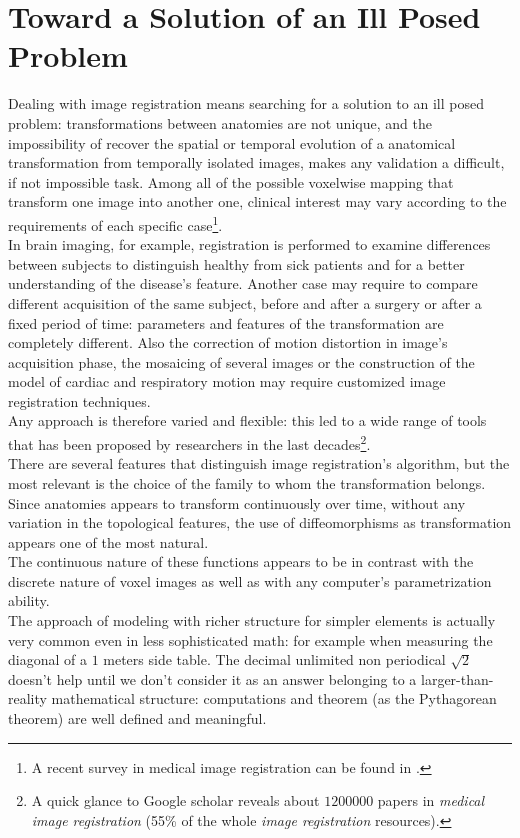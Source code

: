 \section*{Toward a Solution of an Ill Posed Problem}
Dealing with image registration means searching for a solution to an ill posed problem: transformations between anatomies are not unique, and the impossibility of recover the spatial or temporal evolution of a anatomical transformation from temporally isolated images, makes any validation a difficult, if not impossible task. Among all of the possible voxelwise mapping that transform one image into another one, clinical interest may vary according to the requirements of each specific case\footnote{A recent survey in medical image registration can be found in \cite{Sotiras:survey:13}.}. \\
In brain imaging, for example, registration is performed to examine differences between subjects to distinguish healthy from sick patients and for a better understanding of the disease's feature. Another case may require to compare different acquisition of the same subject, before and after a surgery or after a fixed period of time: parameters and features of the transformation are completely different. Also the correction of motion distortion in image's acquisition phase, the mosaicing of several images or the construction of the model of cardiac and respiratory motion may require customized image registration techniques.\\
Any approach is therefore varied and flexible: this led to a wide range of tools that has been proposed by researchers in the last decades\footnote{A quick glance to Google scholar reveals about $1200000$ papers in \emph{medical image registration} (55\% of the whole \emph{image registration} resources).}.\\
There are several features that distinguish image registration's algorithm, but the most relevant is the choice of the family to whom the transformation belongs. Since anatomies appears to transform continuously over time, without any variation in the topological features, the use of diffeomorphisms as transformation appears one of the most natural.\\
The continuous nature of these functions appears to be in contrast with the discrete nature of voxel images as well as with any computer's parametrization ability.\\
The approach of modeling with richer structure for simpler elements is actually very common even in less sophisticated math: for example when measuring the diagonal of a $1$ meters side table. The decimal unlimited non periodical $\sqrt{2}$ doesn't help until we don't consider it as an answer belonging to a larger-than-reality mathematical structure: computations and theorem (as the Pythagorean theorem) are well defined and meaningful.\\ 

